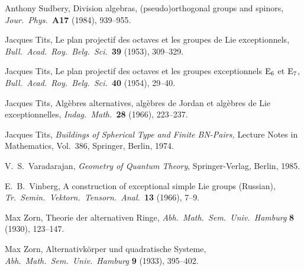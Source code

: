 \documentclass[12pt]{article}
\newcommand{\E}{{\rm E}}
\begin{document}
\begin{thebibliography}{10}
 Anthony Sudbery, Division algebras, (pseudo)orthogonal   
groups and spinors, {\sl Jour.\ Phys.\ }{\bf A17} (1984), 939--955.   
  
 Jacques Tits, Le plan projectif des octaves et les groupes 
de Lie exceptionnels, {\sl Bull.\ Acad.\ Roy.\ Belg.\ Sci.\ }{\bf 39} (1953), 
309--329. 
 
 Jacques Tits, Le plan projectif des octaves et les groupes 
exceptionnels $\E_6$ et $\E_7$, {\sl Bull.\ Acad.\ Roy.\ Belg.\ 
Sci.\ }{\bf 40} (1954), 29--40. 
 
 Jacques Tits, Alg\`ebres alternatives, alg\`ebres de    
Jordan et alg\`ebres de Lie exceptionnelles, {\sl Indag.\ Math.\ }{\bf 28} 
(1966), 223--237.   
 
 Jacques Tits, {\sl Buildings of Spherical Type 
and Finite BN-Pairs, } Lecture Notes in Mathematics, Vol.\ 386,
Springer, Berlin, 1974.  

 V.\ S.\ Varadarajan, {\sl Geometry of Quantum 
Theory}, Springer-Verlag, Berlin, 1985.   

 E.\ B.\ Vinberg, A construction of exceptional
simple Lie groups (Russian), {\sl Tr.\ Semin.\ Vektorn.\ Tensorn.\ 
Anal.\ }{\bf 13} (1966), 7--9.

 Max Zorn, Theorie der alternativen Ringe,    
{\sl Abh.\ Math.\ Sem.\ Univ.\ Hamburg} {\bf 8} (1930), 123--147.   
  
\bibitem{Zorn2} Max Zorn, Alternativk\"orper und quadratische Systeme,   
{\sl Abh.\ Math.\ Sem.\ Univ.\ Hamburg} {\bf 9} (1933), 395--402.   
  
\end{thebibliography}   
\end{document}
